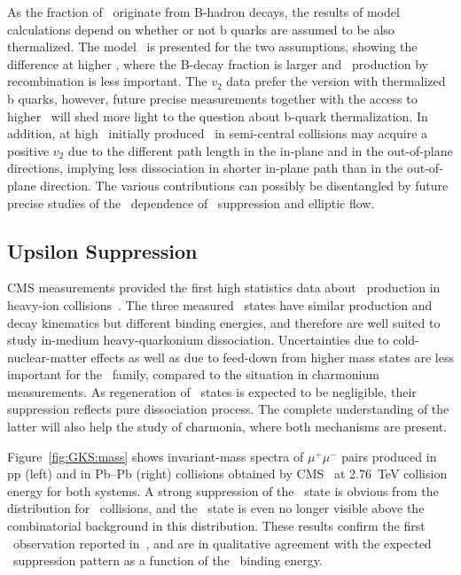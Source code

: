 As the fraction of \Jpsi\ originate from B-hadron decays, the results of model calculations depend on whether or not b quarks are assumed to be also thermalized. The model~\cite{Liu:2009gx} is presented for the two assumptions, showing the difference at higher \pt, where the B-decay fraction is larger and \Jpsi\ production by recombination is less important. The $v_2$ data prefer the version with thermalized b quarks, however, future precise measurements together with the access to higher \pt\ will shed more light to the question about b-quark thermalization. In addition, at high \pt\ initially produced \Jpsi\ in semi-central collisions may acquire a positive $v_2$ due to the different path length in the in-plane and in the out-of-plane directions, implying less dissociation in shorter in-plane path than in the out-of-plane direction. The various contributions can possibly be disentangled
by future precise studies of the \pT\ dependence of \Jpsi\ suppression and elliptic flow.

\subsection{Upsilon Suppression}

CMS measurements provided the first high statistics data about \PgU\ production in heavy-ion collisions~\cite{CMS_Y_2010}. The three measured \PgU\ states have similar production and decay kinematics but different binding energies, and therefore are well suited to study in-medium heavy-quarkonium dissociation.
Uncertainties due to cold-nuclear-matter effects as well as due to feed-down from higher mass states are less important for the \PgU\ family, compared to the situation in charmonium measurements. As regeneration of \PgU\ states is expected to be negligible, their suppression reflects pure dissociation process. The complete understanding of the latter will also help the study of charmonia, where both mechanisms are present.

Figure~\ref{fig:GKS:mass} shows invariant-mass spectra of $\mu^+\mu^-$ pairs produced in pp (left) and in Pb--Pb (right) collisions obtained by CMS~\cite{Chatrchyan:2012lxa} at 2.76~TeV collision energy for both systems.
A strong suppression of the \PgUb\ state is obvious from the
distribution for \PbPb\ collisions, and the \PgUc\ state is even no longer visible above the combinatorial background in this distribution. These results confirm the first \PgU\ observation reported in~\cite{CMS_Y_2010}, and are in qualitative agreement with the expected \PgU\ suppression pattern as a function of the \PgUn\ binding energy.


